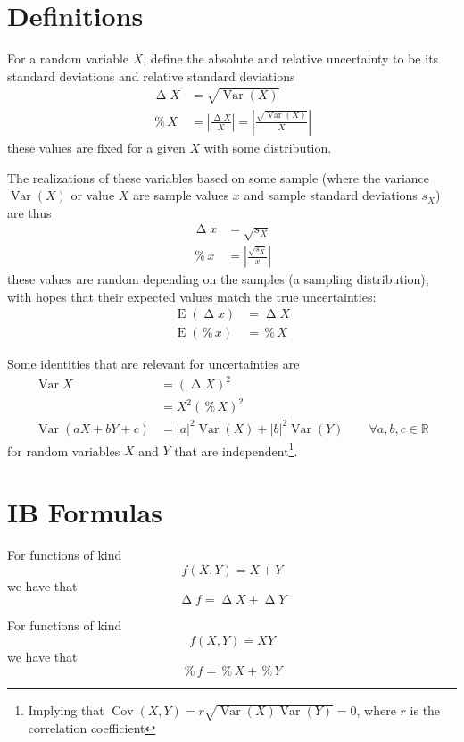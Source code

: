 \documentclass[a4paper,11pt]{article}
\DeclareMathOperator{\var}{\operatorname{Var}}
\DeclareMathOperator{\cov}{\operatorname{Cov}}
\DeclareMathOperator{\uncertabs}{\Delta}
\DeclareMathOperator{\uncertrel}{\%}
\DeclareMathOperator{\ex}{\operatorname{E}}
\begin{document}
\section{Definitions}
For a random variable $X$, define the absolute and relative uncertainty to be its standard deviations and relative standard deviations
\begin{align*}
    \uncertabs X &= \sqrt{\var(X)}\\
    \uncertrel X &= \left| \frac{\uncertabs X}{X} \right| = \left|\frac{\sqrt{\var(X)}}{X} \right|
\end{align*}
these values are fixed for a given $X$ with some distribution.

The realizations of these variables based on some sample (where the variance $\var(X)$ or value $X$ are sample values $x$ and sample standard deviations $s_X$) are thus
\begin{align*}
    \uncertabs x &= \sqrt{s_X}\\
    \uncertrel x &= \left|  \frac{\sqrt{s_X}}{x} \right|
\end{align*}
these values are random depending on the samples (a sampling distribution), with hopes that their expected values match the true uncertainties:
\begin{align*}
    \ex(\uncertabs x) &= \uncertabs X\\
    \ex(\uncertrel x) &= \uncertrel X
\end{align*}

Some identities that are relevant for uncertainties are
\begin{align*}
    \var X &= (\uncertabs X)^2\\
    &= X^2 (\uncertrel X)^2\\
    \var (aX + bY + c) &= |a|^2 \var(X) + |b|^2 \var(Y) \qquad \forall a,b,c\in \mathbb{R}
\end{align*}
for random variables $X$ and $Y$ that are independent\footnote{Implying that $\cov(X,Y)=r \sqrt{\var(X)\var(Y)} = 0$, where $r$ is the correlation coefficient}.

\newpage

\section{IB Formulas}
For functions of kind
\[
    f(X, Y) = X + Y
\]
we have that
\[
    \uncertabs f = \uncertabs X + \uncertabs Y
\]

For functions of kind
\[
    f(X, Y) = XY
\]
we have that
\[
    \uncertrel f = \uncertrel X + \uncertrel Y
\]
\end{document}
